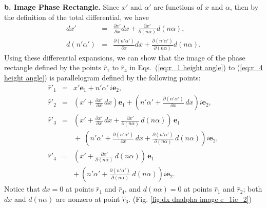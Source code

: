 \documentclass[11pt,twocolumn]{article}
\begin{document}
\textbf{b.  Image Phase Rectangle.}  
Since $x'$ and $\alpha'$ are functions of $x$ and $\alpha$, then by the definition of the total differential, we have
\begin{eqnarray}
\label{eq:dx' total differential height angle}
dx'&=&\frac{\partial x'}{\partial x}dx+\frac{\partial x'}{\partial (n\alpha)}d(n\alpha),\\
\label{eq:dn'alpha' total differential height angle}
d(n'\alpha')&=&\frac{\partial(n'\alpha')}{\partial x}dx+\frac{\partial(n'\alpha')}{\partial(n\alpha)}d(n\alpha).
\end{eqnarray}
Using these differential expansions, we can show that the image of the phase rectangle defined by the points $\hat r_1$ to $\hat r_4$ in Eqs.~(\ref{eq:r_1 height angle}) to (\ref{eq:r_4 height angle}) is parallelogram defined by the following points:
\begin{eqnarray}
\label{eq:r'_1 height angle}
\!\!\!\!\hat r'_1&=&x'\mathbf e_1+n'\alpha'\,i\mathbf e_2,\\
\label{eq:r'_2 height angle}
\!\!\!\!\hat r'_2&=&\!\!(x'+\frac{\partial x'}{\partial x}\,dx)\mathbf e_1+(n'\alpha'+\frac{\partial(n'\alpha')}{\partial x}\,dx)i\mathbf e_2,\\
\label{eq:r'_3 height angle}
\!\!\!\!\hat r'_3&=&\!\!(x'+\frac{\partial x'}{\partial x}\,dx+\frac{\partial x'}{\partial(n\alpha)}\,d(n\alpha))\,\mathbf e_1\nonumber\\
& &\!\!\!\!\!\!\!\!+\ (n'\alpha'+\frac{\partial(n'\alpha')}{\partial x}\,dx+\frac{\partial(n'\alpha')}{\partial(n\alpha)}\,d(n\alpha))i\mathbf e_2,\\
\label{eq:r'_4 height angle}
\!\!\!\!\hat r'_4&=&\!\!(x'+\frac{\partial x'}{\partial(n\alpha)}\,d(n\alpha))\,\mathbf e_1\nonumber\\
& &+\  (n'\alpha'+\frac{\partial(n'\alpha')}{\partial(n\alpha)}\,d(n\alpha))i\mathbf e_2.
\end{eqnarray}
Notice that $dx=0$ at points $\hat r_1$ and $\hat r_4$, and $d(n\alpha)=0$ at points $\hat r_1$ and $\hat r_2$; both $dx$ and $d(n\alpha)$ are nonzero at point $\hat r_3$. (Fig. \ref{fig:dx dnalpha image e_1ie_2})
\end{document}
